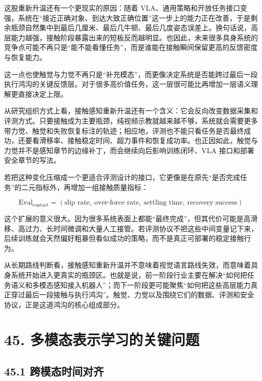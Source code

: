 这股重新升温还有一个更现实的原因：随着 VLA、通用策略和开放任务接口变强，系统在“接近正确对象、到达大致正确位置”这一步上的能力正在改善，于是剩余瓶颈自然集中到最后几厘米、最后几牛顿、最后几度姿态误差上。换句话说，高层能力越强，接触阶段暴露出来的短板反而越明显。也因此，未来很多具身系统的竞争点可能不再只是“能不能看懂任务”，而是谁能在接触瞬间保留更高的反馈密度与恢复能力。

这一点也使触觉与力觉不再只是“补充模态”，而更像决定系统是否能跨过最后一段执行鸿沟的关键反馈层。对于很多高价值任务，这一层很可能比再增加一层语义理解更直接决定上限。

从研究组织方式上看，接触感知重新升温还有一个含义：它会反向改变数据采集和评测方式。只要接触成为主要瓶颈，纯视频示教就越来越不够，系统就会需要更多带力觉、触觉和失败恢复标注的轨迹；相应地，评测也不能只看任务是否最终成功，还要看滑移率、接触稳定时间、超力事件和恢复成功率。也正因如此，触觉与力觉并不是感知章节的边缘补丁，而会继续向后影响训练闭环、VLA 接口和部署安全章节的写法。

若把这种变化压缩成一个更适合评测设计的接口，它更像是在原先“是否完成任务”的二元指标外，再增加一组接触质量指标：

\begingroup
\scriptsize
\begin{equation*}
\text{Eval}_{\text{contact}}
=
(\text{slip rate},\ \text{over-force rate},\ \text{settling time},\ \text{recovery success})
\end{equation*}
\endgroup

这个扩展的意义很大。因为很多系统表面上都能“最终完成”，但其代价可能是高滑移、高过力、长时间微调和大量人工接管。若评测协议不把这些中间变量记下来，后续训练就会天然偏好粗暴但看似成功的策略，而不是真正可部署的稳定接触行为。

从长期路线判断看，接触感知重新升温并不意味着视觉语言路线失效，而意味着具身系统开始进入更真实的瓶颈区。也就是说，前一阶段行业主要在解决“如何把任务语义和多模态感知接入机器人”；而下一阶段更可能聚焦“如何把这些高层能力真正穿过最后一段接触与执行鸿沟”。触觉、力觉以及围绕它们的数据、评测和安全协议，正是这道鸿沟的核心组成部分。

\chapter*{45. 多模态表示学习的关键问题}

\section*{45.1 跨模态时间对齐}


